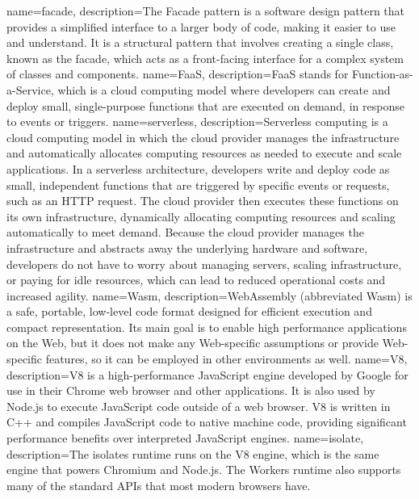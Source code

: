 {
    name=facade,
    description={The Facade pattern is a software design pattern that provides a simplified interface to a larger body of code, making it easier to use and understand. It is a structural pattern that involves creating a single class, known as the facade, which acts as a front-facing interface for a complex system of classes and components.}
}
{
    name=FaaS,
    description={FaaS stands for Function-as-a-Service, which is a cloud computing model where developers can create and deploy small, single-purpose functions that are executed on demand, in response to events or triggers.}
}
{
    name=serverless,
    description={Serverless computing is a cloud computing model in which the cloud provider manages the infrastructure and automatically allocates computing resources as needed to execute and scale applications. In a serverless architecture, developers write and deploy code as small, independent functions that are triggered by specific events or requests, such as an HTTP request. The cloud provider then executes these functions on its own infrastructure, dynamically allocating computing resources and scaling automatically to meet demand. Because the cloud provider manages the infrastructure and abstracts away the underlying hardware and software, developers do not have to worry about managing servers, scaling infrastructure, or paying for idle resources, which can lead to reduced operational costs and increased agility.}
}
{
    name=Wasm,
    description={WebAssembly (abbreviated Wasm) is a safe, portable, low-level code format designed for efficient execution and compact representation. Its main goal is to enable high performance applications on the Web, but it does not make any Web-specific assumptions or provide Web-specific features, so it can be employed in other environments as well.}
}
{
    name=V8,
    description={V8 is a high-performance JavaScript engine developed by Google for use in their Chrome web browser and other applications. It is also used by Node.js to execute JavaScript code outside of a web browser. V8 is written in C++ and compiles JavaScript code to native machine code, providing significant performance benefits over interpreted JavaScript engines.}
}
{
    name=isolate,
    description={The isolates runtime runs on the V8 engine, which is the same engine that powers Chromium and Node.js. The Workers runtime also supports many of the standard APIs that most modern browsers have.}
}
